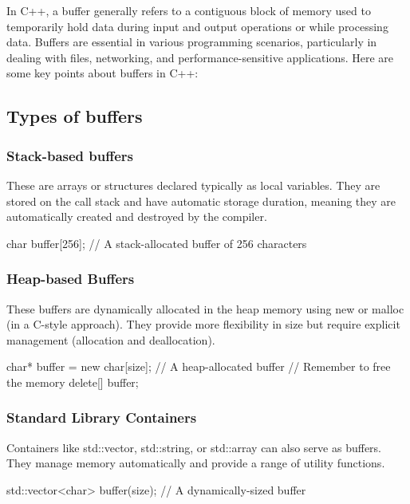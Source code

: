\documentclass{report}
\begin{document}
    \pagebreak 
    \bigbreak \noindent 
    \begin{concept}
         In C++, a buffer generally refers to a contiguous block of memory used to temporarily hold data during input and output operations or while processing data. Buffers are essential in various programming scenarios, particularly in dealing with files, networking, and performance-sensitive applications. Here are some key points about buffers in C++:
    \end{concept}
    \bigbreak \noindent 
    \subsection{Types of buffers}
    \bigbreak \noindent 
    \subsubsection{Stack-based buffers}
    \bigbreak \noindent 
    These are arrays or structures declared typically as local variables. They are stored on the call stack and have automatic storage duration, meaning they are automatically created and destroyed by the compiler.
    \bigbreak \noindent 
    \begin{cppcode}
    char buffer[256]; // A stack-allocated buffer of 256 characters
    \end{cppcode}
    \bigbreak \noindent 
    \subsubsection{Heap-based Buffers}
    \bigbreak \noindent 
    These buffers are dynamically allocated in the heap memory using new or malloc (in a C-style approach). They provide more flexibility in size but require explicit management (allocation and deallocation).
    \bigbreak \noindent 
    \begin{cppcode}
    char* buffer = new char[size]; // A heap-allocated buffer
    // Remember to free the memory
    delete[] buffer;
    \end{cppcode}
    \bigbreak \noindent 
    \subsubsection{Standard Library Containers}
    \bigbreak \noindent 
    Containers like std::vector, std::string, or std::array can also serve as buffers. They manage memory automatically and provide a range of utility functions.
    \bigbreak \noindent 
    \begin{cppcode}
    std::vector<char> buffer(size); // A dynamically-sized buffer
    \end{cppcode}
\end{document}
